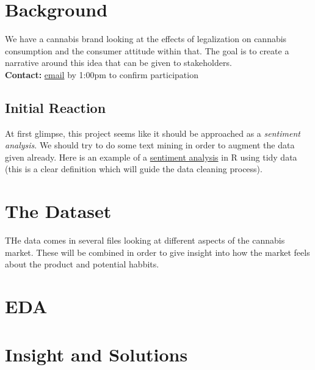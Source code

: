 \documentclass[12pt,a4paper]{book}
\begin{document}
\section{Background}
We have a cannabis brand looking at the effects of legalization on cannabis consumption and the consumer attitude within that. The goal is to create a narrative around this idea that can be given to stakeholders. \\
\textbf{Contact:} \href{mailto:DDLCanada@dentsuaegis.com}{email} by 1:00pm to confirm participation 

\subsection{Initial Reaction}
At first glimpse, this project seems like it should be approached as a \textit{sentiment analysis}. We should try to do some text mining in order to augment the data given already. Here is an example of a \href{https://www.tidytextmining.com/sentiment.html}{sentiment analysis} in R using tidy data (this is a clear definition which will guide the data cleaning process).


\section{The Dataset}
THe data comes in several files looking at different aspects of the cannabis market. These will be combined in order to give insight into how the market feels about the product and potential habbits. 

\section{EDA}

\section{Insight and Solutions}
\end{document}
